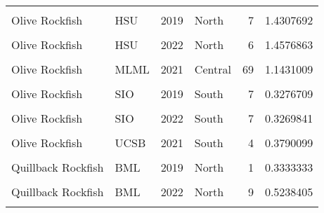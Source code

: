 \documentclass[
]{article}
\begin{document}
\begin{longtable}[t]{llrlrr}
\cellcolor{gray!6}{Olive Rockfish} & \cellcolor{gray!6}{Cal Poly} & \cellcolor{gray!6}{2022} & \cellcolor{gray!6}{Central} & \cellcolor{gray!6}{38} & \cellcolor{gray!6}{0.7772227}\\
Olive Rockfish & HSU & 2019 & North & 7 & 1.4307692\\
\addlinespace
\cellcolor{gray!6}{Olive Rockfish} & \cellcolor{gray!6}{HSU} & \cellcolor{gray!6}{2021} & \cellcolor{gray!6}{North} & \cellcolor{gray!6}{14} & \cellcolor{gray!6}{2.1862810}\\
Olive Rockfish & HSU & 2022 & North & 6 & 1.4576863\\
\cellcolor{gray!6}{Olive Rockfish} & \cellcolor{gray!6}{MLML} & \cellcolor{gray!6}{2019} & \cellcolor{gray!6}{Central} & \cellcolor{gray!6}{127} & \cellcolor{gray!6}{1.1693979}\\
Olive Rockfish & MLML & 2021 & Central & 69 & 1.1431009\\
\cellcolor{gray!6}{Olive Rockfish} & \cellcolor{gray!6}{MLML} & \cellcolor{gray!6}{2022} & \cellcolor{gray!6}{Central} & \cellcolor{gray!6}{54} & \cellcolor{gray!6}{0.8360266}\\
\addlinespace
Olive Rockfish & SIO & 2019 & South & 7 & 0.3276709\\
\cellcolor{gray!6}{Olive Rockfish} & \cellcolor{gray!6}{SIO} & \cellcolor{gray!6}{2021} & \cellcolor{gray!6}{South} & \cellcolor{gray!6}{5} & \cellcolor{gray!6}{0.9801865}\\
Olive Rockfish & SIO & 2022 & South & 7 & 0.3269841\\
\cellcolor{gray!6}{Olive Rockfish} & \cellcolor{gray!6}{UCSB} & \cellcolor{gray!6}{2019} & \cellcolor{gray!6}{South} & \cellcolor{gray!6}{6} & \cellcolor{gray!6}{0.3348873}\\
Olive Rockfish & UCSB & 2021 & South & 4 & 0.3790099\\
\addlinespace
\cellcolor{gray!6}{Olive Rockfish} & \cellcolor{gray!6}{UCSB} & \cellcolor{gray!6}{2022} & \cellcolor{gray!6}{South} & \cellcolor{gray!6}{7} & \cellcolor{gray!6}{0.4618881}\\
Quillback Rockfish & BML & 2019 & North & 1 & 0.3333333\\
\cellcolor{gray!6}{Quillback Rockfish} & \cellcolor{gray!6}{BML} & \cellcolor{gray!6}{2021} & \cellcolor{gray!6}{North} & \cellcolor{gray!6}{5} & \cellcolor{gray!6}{0.7678571}\\
Quillback Rockfish & BML & 2022 & North & 9 & 0.5238405\\
\cellcolor{gray!6}{Quillback Rockfish} & \cellcolor{gray!6}{HSU} & \cellcolor{gray!6}{2019} & \cellcolor{gray!6}{North} & \cellcolor{gray!6}{22} & \cellcolor{gray!6}{1.3763665}\\

\end{longtable}
\end{document}
